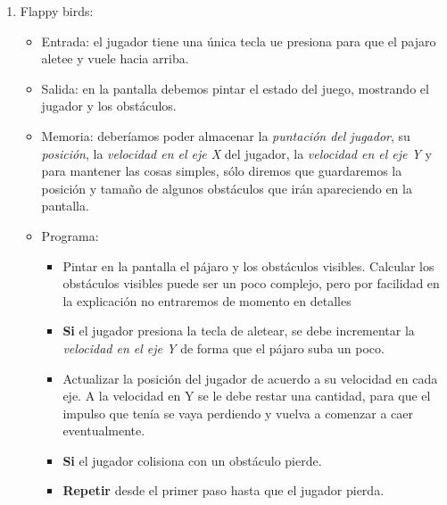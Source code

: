 \begin{Answer}
\begin{enumerate}
\item Flappy birds:
	\begin{itemize}
		\item Entrada: el jugador tiene una única tecla ue presiona para que el pajaro aletee y vuele hacia arriba.
		\item Salida: en la pantalla debemos pintar el estado del juego, mostrando el jugador y los obstáculos.
		\item Memoria: deberíamos poder almacenar la \emph{puntación del jugador}, su \emph{posición}, la \emph{velocidad en el eje X} del jugador, la \emph{velocidad en el eje Y} y para mantener las cosas simples, sólo diremos que guardaremos la posición y tamaño de algunos obstáculos que irán apareciendo en la pantalla.
		\item Programa:
		\begin{itemize}
			\item Pintar en la pantalla el pájaro y los obstáculos visibles. Calcular los obstáculos visibles puede ser un poco complejo, pero por facilidad en la explicación no entraremos de momento en detalles		
			\item \textbf{Si} el jugador presiona la tecla de aletear, se debe incrementar la \emph{velocidad en el eje Y} de forma que el pájaro suba un poco.					
			\item Actualizar la posición del jugador de acuerdo a su velocidad en cada eje. A la velocidad en Y se le debe restar una cantidad, para que el impulso que tenía se vaya perdiendo y vuelva a comenzar a caer eventualmente.
			\item \textbf{Si} el jugador colisiona con un obstáculo pierde.
			\item \textbf{Repetir} desde el primer paso hasta que el jugador pierda.
		\end{itemize}
		
	\end{itemize}
\end{enumerate}
\newpage
\end{Answer}

\newpage
